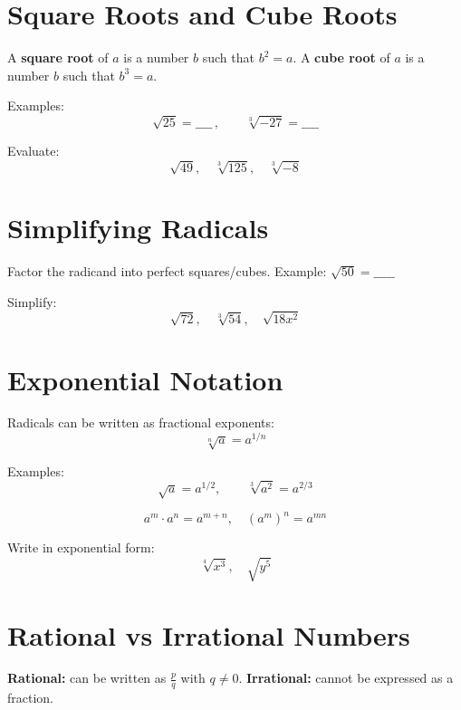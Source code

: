 \documentclass[12pt]{article}
\begin{document}
\section{Square Roots and Cube Roots}
\begin{notebox}[Definition]
A \textbf{square root} of $a$ is a number $b$ such that $b^2 = a$.  
A \textbf{cube root} of $a$ is a number $b$ such that $b^3 = a$.
\end{notebox}

\noindent Examples:
\[
\sqrt{25} = \_\_\_\_\,, \qquad \sqrt[3]{-27} = \_\_\_\_ 
\]

\begin{notebox}[Practice]
Evaluate:
\[
\sqrt{49}, \quad \sqrt[3]{125}, \quad \sqrt[3]{-8}
\]
\end{notebox}

\section{Simplifying Radicals}
\begin{notebox}
Factor the radicand into perfect squares/cubes.  
Example: $\sqrt{50} = \_\_\_\_\_$
\end{notebox}

\begin{notebox}[Practice]
Simplify:
\[
\sqrt{72}, \quad \sqrt[3]{54}, \quad \sqrt{18x^2}
\]
\end{notebox}

\section{Exponential Notation}
\begin{notebox}[Definition]
Radicals can be written as fractional exponents:
\[
\sqrt[n]{a} = a^{1/n}
\]
\end{notebox}

\noindent Examples:
\[
\sqrt{a} = a^{1/2}, \qquad \sqrt[3]{a^2} = a^{2/3}
\]

\begin{notebox}
\[
a^m \cdot a^n = a^{m+n}, \quad (a^m)^n = a^{mn}
\]
\end{notebox}

\begin{notebox}[Practice]
Write in exponential form:
\[
\sqrt[4]{x^3}, \quad \sqrt{y^5}
\]
\end{notebox}

\section{Rational vs Irrational Numbers}
\begin{notebox}[Definitions]
\textbf{Rational:} can be written as $\tfrac{p}{q}$ with $q \neq 0$.  
\textbf{Irrational:} cannot be expressed as a fraction.
\end{notebox}
\end{document}
